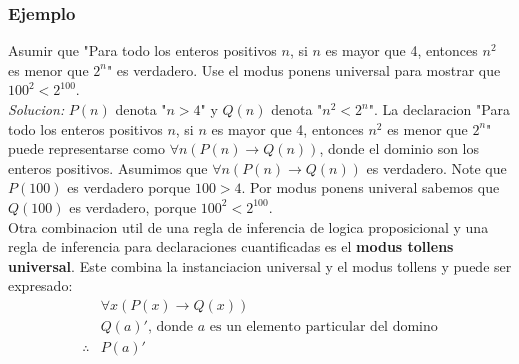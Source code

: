 \documentclass[]{article}
\begin{document}
\subsubsection*{Ejemplo}

Asumir que "Para todo los enteros positivos $n$, si $n$ es mayor que 4, entonces $n^{2}$ es menor que $2^{n}$" es verdadero. Use el modus ponens universal para mostrar que $100^{2} < 2^{100}$.\\
\textit{Solucion:} $P(n)$ denota "$n > 4$" y $Q(n)$ denota "$n^{2} < 2^{n}$". La declaracion "Para todo los enteros positivos $n$, si $n$ es mayor que 4, entonces $n^{2}$ es menor que $2^{n}$" puede representarse como $\forall n(P(n) \rightarrow Q(n))$, donde el dominio son los enteros positivos. Asumimos que $\forall n(P(n) \rightarrow Q(n))$ es verdadero. Note que $P(100)$ es verdadero porque $100 > 4$. Por modus ponens univeral sabemos que $Q(100)$ es verdadero, porque $100^{2} < 2^{100}$.\\

Otra combinacion util de una regla de inferencia de logica proposicional y una regla de inferencia para declaraciones cuantificadas es el \textbf{modus tollens universal}. Este combina la instanciacion universal y el modus tollens y puede ser expresado:
\begin{equation*}
	\begin{aligned}
		&\forall x(P(x) \rightarrow Q(x))\\
		&Q(a)'\text{, donde $a$ es un elemento particular del domino}\\
		\therefore &P(a)'
	\end{aligned}
\end{equation*}
\end{document}
